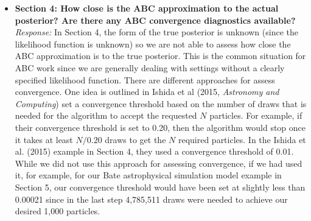 \documentclass[11pt, oneside]{article}   	%
\newcommand{\todo}[1]{{\color{red}[[\textbf{TODO: }#1]]}}
\begin{document}
\begin{itemize}
\item  {\bf  Section 4: How close is the ABC approximation to the actual posterior? Are there any ABC convergence diagnostics available?} \\
\noindent \emph{Response:} In Section 4, the form of the true posterior is unknown (since the likelihood function is unknown) so we are not able to assess how close the ABC approximation is to the true posterior.  This is the common situation for ABC work since we are generally dealing with settings without a clearly specified likelihood function.
There are different approaches for assess convergence.  One idea is outlined in Ishida et al (2015, \emph{Astronomy and Computing}) set a convergence threshold based on the number of draws that is needed for the algorithm to accept the requested $N$ particles.  For example, if their convergence threshold is set to 0.20, then the algorithm would stop once it takes at least $N/0.20$ draws to get the $N$ required particles.  In the Ishida et al. (2015) example in Section 4, they used a convergence threshold of 0.01.  
While we did not use this approach for assessing convergence, if we had used it, for example, for our Bate astrophysical simulation model example in Section 5, our convergence threshold would have been set at slightly less than 0.00021 since in the last step 4,785,511 draws were needed to achieve our desired 1,000 particles.
\bigskip
\end{itemize}


\\
\end{document}
